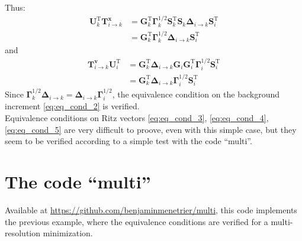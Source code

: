 \documentclass[12pt]{scrartcl}
\begin{document}
Thus:
\begin{align}
\mathbf{U}_k^\mathrm{T} \mathbf{T}^\mathbf{x}_{i \rightarrow k} & = \mathbf{G}^\mathrm{T}_k \boldsymbol{\Gamma}_k^{1/2} \mathbf{S}^\mathrm{T}_k \mathbf{S}_k \boldsymbol{\Delta}_{i \rightarrow k} \mathbf{S}^\mathrm{T}_i \nonumber \\
 & = \mathbf{G}^\mathrm{T}_k \boldsymbol{\Gamma}_k^{1/2}\boldsymbol{\Delta}_{i \rightarrow k} \mathbf{S}^\mathrm{T}_i
\end{align}
and
\begin{align}
\mathbf{T}^\mathbf{v}_{i \rightarrow k} \mathbf{U}_i^\mathrm{T} & = \mathbf{G}^\mathrm{T}_k \boldsymbol{\Delta}_{i \rightarrow k} \mathbf{G}_i \mathbf{G}^\mathrm{T}_i \boldsymbol{\Gamma}_i^{1/2} \mathbf{S}^\mathrm{T}_i \nonumber \\
& = \mathbf{G}^\mathrm{T}_k \boldsymbol{\Delta}_{i \rightarrow k}  \boldsymbol{\Gamma}_i^{1/2} \mathbf{S}^\mathrm{T}_i
\end{align}
Since $\boldsymbol{\Gamma}_k^{1/2}\boldsymbol{\Delta}_{i \rightarrow k} = \boldsymbol{\Delta}_{i \rightarrow k}  \boldsymbol{\Gamma}_i^{1/2}$, the equivalence condition on the background increment \eqref{eq:eq_cond_2} is verified.\\

Equivalence conditions on Ritz vectors \eqref{eq:eq_cond_3}, \eqref{eq:eq_cond_4}, \eqref{eq:eq_cond_5} are very difficult to proove, even with this simple case, but they seem to be verified according to a simple test with the code ``multi''.\\

\section{The code ``multi''}
Available at \url{https://github.com/benjaminmenetrier/multi}, this code implements the previous example, where the equivalence conditions are verified for a multi-resolution minimization.\\
\end{document}

